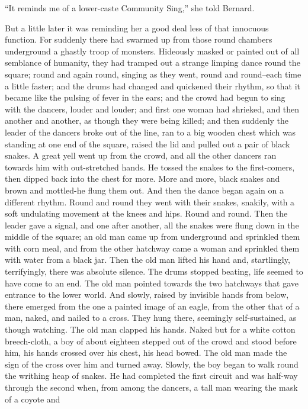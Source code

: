 \documentclass[12pt]{report}
\begin{document}
``It reminds me of a lower-caste Community Sing,'' she told Bernard.

But a little later it was reminding her a good deal less of that
innocuous function. For suddenly there had swarmed up from those round
chambers underground a ghastly troop of monsters. Hideously masked or
painted out of all semblance of humanity, they had tramped out a strange
limping dance round the square; round and again round, singing as they
went, round and round--each time a little faster; and the drums had
changed and quickened their rhythm, so that it became like the pulsing
of fever in the ears; and the crowd had begun to sing with the dancers,
louder and louder; and first one woman had shrieked, and then another
and another, as though they were being killed; and then suddenly the
leader of the dancers broke out of the line, ran to a big wooden chest
which was standing at one end of the square, raised the lid and pulled
out a pair of black snakes. A great yell went up from the crowd, and all
the other dancers ran towards him with out-stretched hands. He tossed
the snakes to the first-comers, then dipped back into the chest for
more. More and more, black snakes and brown and mottled-he flung them
out. And then the dance began again on a different rhythm. Round and
round they went with their snakes, snakily, with a soft undulating
movement at the knees and hips. Round and round. Then the leader gave a
signal, and one after another, all the snakes were flung down in the
middle of the square; an old man came up from underground and sprinkled
them with corn meal, and from the other hatchway came a woman and
sprinkled them with water from a black jar. Then the old man lifted his
hand and, startlingly, terrifyingly, there was absolute silence. The
drums stopped beating, life seemed to have come to an end. The old man
pointed towards the two hatchways that gave entrance to the lower world.
And slowly, raised by invisible hands from below, there emerged from the
one a painted image of an eagle, from the other that of a man, naked,
and nailed to a cross. They hung there, seemingly self-sustained, as
though watching. The old man clapped his hands. Naked but for a white
cotton breech-cloth, a boy of about eighteen stepped out of the crowd
and stood before him, his hands crossed over his chest, his head bowed.
The old man made the sign of the cross over him and turned away. Slowly,
the boy began to walk round the writhing heap of snakes. He had
completed the first circuit and was half-way through the second when,
from among the dancers, a tall man wearing the mask of a coyote and
\end{document}
